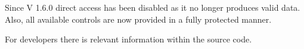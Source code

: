 
    Since V 1.6.0 direct access has been disabled as it no longer produces
    valid data. Also, all available controls are now provided in a fully
    protected manner.

   For developers there is relevant information within the source code.

